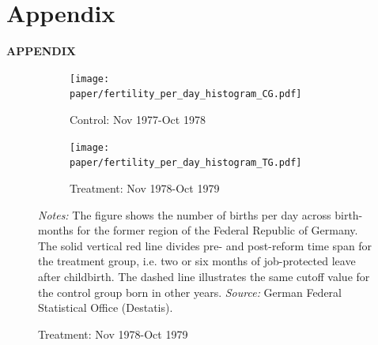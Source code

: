 \documentclass[11pt, a4paper]{article} %
\begin{document}
\newpage
\TODO\section{Appendix}
\vspace*{\fill}
{\Huge \begin{center}\textbf{APPENDIX}\end{center}}
\vspace*{\fill}\clearpage


\renewcommand\thefigure{A\arabic{figure}}
\setcounter{figure}{0} 
\captionsetup[subfigure]{labelformat=parens}
\begin{landscape}
	\vspace*{\fill}
	\begin{figure}
		[H]\centering
		\caption{Fertility distribution for different years}\label{fig: fertility_hist}
		\begin{subfigure}[h]{0.40\linewidth}\centering
			\caption{Control: Nov 1977-Oct 1978}
			\texttt{[image: paper/fertility\_per\_day\_histogram\_CG.pdf]}
		\end{subfigure}
		\begin{subfigure}[h]{0.40\linewidth}\centering
			\caption{Treatment: Nov 1978-Oct 1979}
			\texttt{[image: paper/fertility\_per\_day\_histogram\_TG.pdf]}
		\end{subfigure}
		\scriptsize
		\begin{minipage}{0.95\linewidth}
			\emph{Notes:} The figure shows the number of births per day across birth-months for the former region of the Federal Republic of Germany. The solid vertical red line divides pre- and post-reform time span for the treatment group, i.e. two or six months of job-protected leave after childbirth. The dashed line illustrates the same cutoff value for the control group born in other years.\newline
			\emph{Source:} German Federal Statistical Office (Destatis).
		\end{minipage}
	\end{figure}
	\vspace*{\fill}\clearpage
\end{landscape}
\vspace*{\fill}
\end{document}
